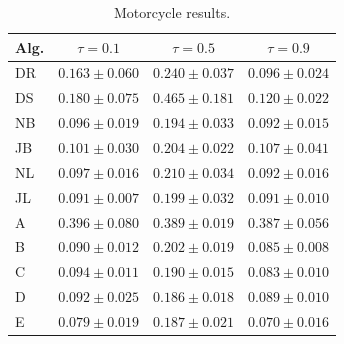 \documentclass[twoside]{article} \usepackage{aistats2017}
\theoremstyle{definition}
\begin{document}
		
		\begin{table}
			\begin{center}
				\begin{tabular}{l|ccc}
					Alg. & $\tau = 0.1$     & $\tau = 0.5$  & $\tau = 0.9$      \\ \hline
					DR & $0.163 \pm 0.060$ & $0.240 \pm 0.037$ & $0.096 \pm 0.024$ \\
					DS & $0.180 \pm 0.075$ & $0.465 \pm 0.181$ & $0.120 \pm 0.022$ \\
					NB & $0.096 \pm 0.019$ & $0.194 \pm 0.033$ & $0.092 \pm 0.015$ \\
					JB & $0.101 \pm 0.030$ & $0.204 \pm 0.022$ & $0.107 \pm 0.041$ \\
					NL & $0.097 \pm 0.016$ & $0.210 \pm 0.034$ & $0.092 \pm 0.016$ \\
					JL & $0.091 \pm 0.007$ & $0.199 \pm 0.032$ & $0.091 \pm 0.010$ \\
					A & $0.396 \pm 0.080$ & $0.389 \pm 0.019$ & $0.387 \pm 0.056$ \\
					B & $0.090 \pm 0.012$ & $0.202 \pm 0.019$ & $0.085 \pm 0.008$ \\
					C & $0.094 \pm 0.011$ & $0.190 \pm 0.015$ & $0.083 \pm 0.010$ \\
					D & $0.092 \pm 0.025$ & $\mathbf{0.186 \pm 0.018}$ & $0.089 \pm 0.010$ \\
					E & $\mathbf{0.079 \pm 0.019}$ & $0.187 \pm 0.021$ & $\mathbf{0.070 \pm
						0.016}$
				\end{tabular}
			\end{center}
			\caption{Motorcycle results.}
			\label{table:motorcycle}
		\end{table}
		
\end{document}
